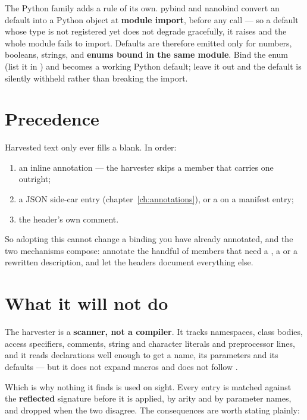 \begin{warn}
The Python family adds a rule of its own. pybind and nanobind convert an
 default into a Python object at \textbf{module import}, before any
call --- so a default whose type is not registered yet does not degrade
gracefully, it raises  and the
whole module fails to import. Defaults are therefore emitted only for numbers,
booleans, strings, and \textbf{enums bound in the same module}. Bind the enum
(list it in ) and  becomes a working Python
default; leave it out and the default is silently withheld rather than breaking
the import.
\end{warn}

\section{Precedence}

Harvested text only ever fills a blank. In order:

\begin{enumerate}[leftmargin=*]
  \item an inline \code{[[= rosetta::doc\{"\ldots"\}]]} annotation --- the
    harvester skips a member that carries one outright;
  \item a JSON side-car entry (chapter~\ref{ch:annotations}), or a
     on a manifest  entry;
  \item the header's own comment.
\end{enumerate}

So adopting this cannot change a binding you have already annotated, and the
two mechanisms compose: annotate the handful of members that need a
, a  or a rewritten description, and let the headers
document everything else.

\section{What it will not do}

The harvester is a \textbf{scanner, not a compiler}. It tracks namespaces, class
bodies, access specifiers, comments, string and character literals and
preprocessor lines, and it reads declarations well enough to get a name, its
parameters and its defaults --- but it does not expand macros and does not
follow .

Which is why nothing it finds is used on sight. Every entry is matched against
the \textbf{reflected} signature before it is applied, by arity and by
parameter names, and dropped when the two disagree. The consequences are worth
stating plainly:

